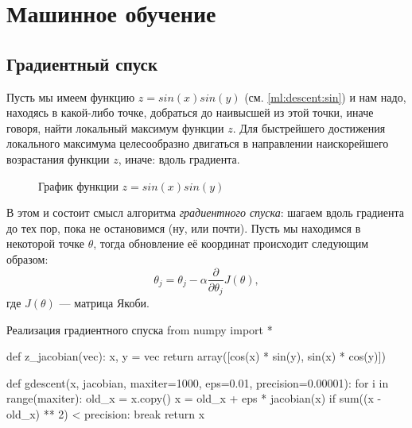 \chapter{Машинное обучение}
\label{ch:ml}

\section{Градиентный спуск}
Пусть мы имеем функцию $z = sin(x)sin(y)$ (см. \autoref{ml:descent:sin}) и нам надо, находясь в какой-либо точке, добраться до наивысшей из этой точки, иначе говоря, найти локальный максимум функции $z$. Для быстрейшего достижения локального максимума целесообразно двигаться в направлении наискорейшего возрастания функции $z$, иначе: вдоль градиента.

\IfNotDraft
{
\begin{figure}[htb]
  \centering
  \caption{График функции $z = sin(x)sin(y)$}
  \label{ml:descent:sin}
\end{figure}
}

В этом и состоит смысл алгоритма \emph{градиентного спуска}: шагаем вдоль градиента до тех пор, пока не остановимся (ну, или почти). Пусть мы находимся в некоторой точке $\theta$, тогда обновление её координат происходит следующим образом:
\[
\theta_j = \theta_j - \alpha\frac{\partial}{\partial\theta_j}J(\theta),
\]
где $J(\theta)$ — матрица Якоби.

\begin{pylst}{Реализация градиентного спуска}{}
from numpy import *

def z_jacobian(vec):
    x, y = vec
    return array([cos(x) * sin(y),
                  sin(x) * cos(y)])

def gdescent(x, jacobian, maxiter=1000, eps=0.01, precision=0.00001):
    for i in range(maxiter):
        old_x = x.copy()
        x = old_x + eps * jacobian(x)
        if sum((x - old_x) ** 2) < precision:
            break
    return x
\end{pylst}

